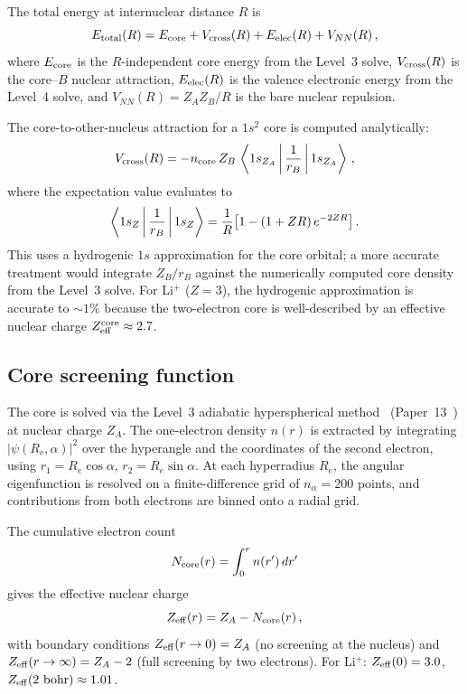 \documentclass[aps,pra,twocolumn,superscriptaddress,longbibliography,floatfix]{revtex4-2}
\begin{document}
The total energy at internuclear distance $R$ is
\begin{equation}
  E_{\rm total}(R) = E_{\rm core} + V_{\rm cross}(R)
    + E_{\rm elec}(R) + V_{NN}(R)\,,
  \label{eq:Etotal}
\end{equation}
where $E_{\rm core}$ is the $R$-independent core energy from the
Level~3 solve, $V_{\rm cross}(R)$ is the core--$B$ nuclear attraction,
$E_{\rm elec}(R)$ is the valence electronic energy from the Level~4
solve, and $V_{NN}(R) = Z_A Z_B / R$ is the bare nuclear repulsion.

The core-to-other-nucleus attraction for a $1s^2$ core is computed
analytically:
\begin{equation}
  V_{\rm cross}(R) = -n_{\rm core}\, Z_B\,
    \Braket{1s_{Z_A} | \frac{1}{r_B} | 1s_{Z_A}}\,,
  \label{eq:Vcross}
\end{equation}
where the expectation value evaluates to
\begin{equation}
  \Braket{1s_Z | \frac{1}{r_B} | 1s_Z}
    = \frac{1}{R}\bigl[1 - (1 + ZR)\,e^{-2ZR}\bigr]\,.
  \label{eq:1s_expectation}
\end{equation}
This uses a hydrogenic $1s$ approximation for the core orbital; a more
accurate treatment would integrate $Z_B/r_B$ against the numerically
computed core density from the Level~3 solve.  For Li$^+$ ($Z=3$),
the hydrogenic approximation is accurate to ${\sim}1\%$ because the
two-electron core is well-described by an effective nuclear charge
$Z_{\rm eff}^{\rm core} \approx 2.7$.


\subsection{Core screening function}
\label{sec:screening}

The core is solved via the Level~3 adiabatic hyperspherical
method~\cite{lin1995} (Paper~13~\cite{paper13}) at nuclear charge $Z_A$.  The one-electron
density $n(r)$ is extracted by integrating $|\psi(R_e, \alpha)|^2$
over the hyperangle and the coordinates of the second electron,
using $r_1 = R_e \cos\alpha$, $r_2 = R_e \sin\alpha$.
At each hyperradius $R_e$, the angular eigenfunction is resolved on a
finite-difference grid of $n_\alpha = 200$ points, and contributions
from both electrons are binned onto a radial grid.

The cumulative electron count
\begin{equation}
  N_{\rm core}(r) = \int_0^r n(r')\,dr'
  \label{eq:Ncore}
\end{equation}
gives the effective nuclear charge
\begin{equation}
  Z_{\rm eff}(r) = Z_A - N_{\rm core}(r)\,,
  \label{eq:Zeff}
\end{equation}
with boundary conditions $Z_{\rm eff}(r\to 0) = Z_A$ (no screening at
the nucleus) and $Z_{\rm eff}(r\to\infty) = Z_A - 2$ (full screening
by two electrons).  For Li$^+$: $Z_{\rm eff}(0) = 3.0$,
$Z_{\rm eff}(2\text{ bohr}) \approx 1.01$.
\end{document}

